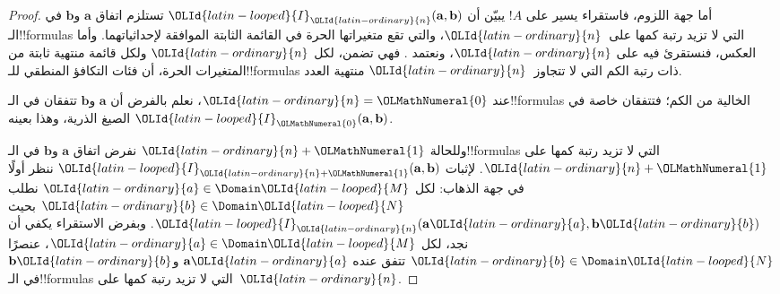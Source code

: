 \documentclass[../../../include/open-logic-section]{subfiles}
\begin{document}
\begin{proof}
  أما جهة اللزوم، فاستقراء يسير على $!A$ يبيّن أن
  $\OLId{latin-looped}{I}_\OLId{latin-ordinary}{n}(\mathbf{a},\mathbf{b})$ تستلزم اتفاق $\mathbf{a}$ و$\mathbf{b}$
  في الـ!!{formula}s التي لا تزيد رتبة كمها على~$\OLId{latin-ordinary}{n}$، والتي تقع
  متغيراتها الحرة في القائمة الثابتة الموافقة لإحداثياتهما.
  وأما العكس، فنستقرئ فيه على $\OLId{latin-ordinary}{n}$، ونعتمد
  . فهي تضمن، لكل $\OLId{latin-ordinary}{n}$ ولكل قائمة منتهية
  ثابتة من المتغيرات الحرة، أن فئات التكافؤ المنطقي
  للـ!!{formula}s ذات رتبة الكم التي لا تتجاوز~$\OLId{latin-ordinary}{n}$ منتهية العدد.

  عند $\OLId{latin-ordinary}{n}=\OLMathNumeral{0}$، نعلم بالفرض أن $\mathbf{a}$ و$\mathbf{b}$ تتفقان
  في الـ!!{formula}s الخالية من الكم؛ فتتفقان خاصة في الصيغ
  الذرية، وهذا بعينه $\OLId{latin-looped}{I}_\OLMathNumeral{0}(\mathbf{a},\mathbf{b})$.

  وللحالة $\OLId{latin-ordinary}{n}+\OLMathNumeral{1}$ نفرض اتفاق $\mathbf{a}$ و$\mathbf{b}$ في
  الـ!!{formula}s التي لا تزيد رتبة كمها على $\OLId{latin-ordinary}{n}+\OLMathNumeral{1}$.
  لإثبات $\OLId{latin-looped}{I}_{\OLId{latin-ordinary}{n}+\OLMathNumeral{1}}(\mathbf{a},\mathbf{b})$ ننظر أولًا في جهة
  الذهاب: لكل $\OLId{latin-ordinary}{a} \in \Domain \OLId{latin-looped}{M}$ نطلب $\OLId{latin-ordinary}{b} \in \Domain \OLId{latin-looped}{N}$ بحيث
  $\OLId{latin-looped}{I}_\OLId{latin-ordinary}{n}(\mathbf{a}\OLId{latin-ordinary}{a},\mathbf{b}\OLId{latin-ordinary}{b})$. وبفرض الاستقراء يكفي أن
  نجد، لكل $\OLId{latin-ordinary}{a} \in \Domain \OLId{latin-looped}{M}$، عنصرًا $\OLId{latin-ordinary}{b} \in \Domain \OLId{latin-looped}{N}$
  تتفق عنده $\mathbf{a}\OLId{latin-ordinary}{a}$ و$\mathbf{b}\OLId{latin-ordinary}{b}$ في الـ!!{formula}s
  التي لا تزيد رتبة كمها على~$\OLId{latin-ordinary}{n}$.


\end{proof}
\end{document}
